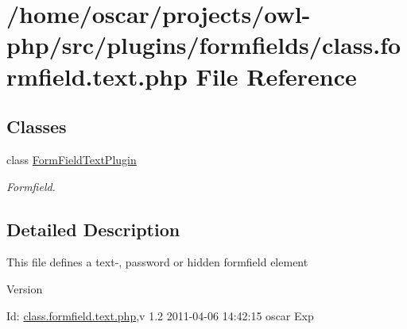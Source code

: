 \section{/home/oscar/projects/owl-\/php/src/plugins/formfields/class.formfield.text.php File Reference}
\label{class_8formfield_8text_8php}
\subsection*{Classes}
\begin{DoxyCompactItemize}
\item 
class \hyperlink{classFormFieldTextPlugin}{FormFieldTextPlugin}
\begin{DoxyCompactList}\small\item\em Formfield. \item\end{DoxyCompactList}\end{DoxyCompactItemize}


\subsection{Detailed Description}
This file defines a text-\/, password or hidden formfield element \begin{DoxyVersion}{Version}

\end{DoxyVersion}
\begin{DoxyParagraph}{Id:}
\hyperlink{class_8formfield_8text_8php}{class.formfield.text.php},v 1.2 2011-\/04-\/06 14:42:15 oscar Exp 
\end{DoxyParagraph}
